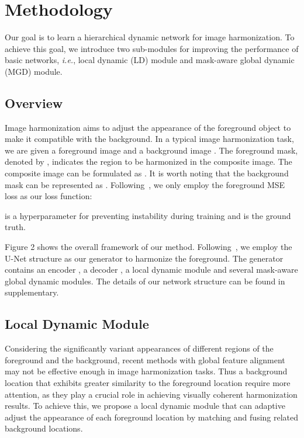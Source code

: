 \documentclass[sigconf]{acmart}
\begin{document}
\section{Methodology}
Our goal is to learn a hierarchical dynamic network for image harmonization. To achieve this goal, we introduce two sub-modules for improving the performance of basic networks, \emph{i.e.}, local dynamic (LD) module and mask-aware global dynamic (MGD) module.

\subsection{Overview}
Image harmonization aims to adjust the appearance of the foreground object to make it compatible with the background. In a typical image harmonization task, we are given a foreground image  and a background image . The foreground mask, denoted by , indicates the region to be harmonized in the composite image. The composite image  can be formulated as . It is worth noting that the background mask can be represented as .
Following~\cite{sofiiuk2021foreground}, we only employ the foreground MSE loss as our loss function:

 is a hyperparameter for preventing instability during training and  is the ground truth. 

Figure 2 shows the overall framework of our method. Following~\cite{AdaIN,Bargainnet,CDTNet,Harmonizer}, we employ the U-Net structure as our generator  to harmonize the foreground. The generator  contains an encoder , a decoder , a local dynamic module and several mask-aware global dynamic modules. The details of our network structure can be found in supplementary.
\subsection{Local Dynamic Module}
Considering the significantly variant appearances of different regions of the
foreground and the background, recent methods with global feature alignment may not be effective enough in image harmonization tasks. Thus a background location that exhibits greater similarity to the foreground location require more attention, as they play a crucial role in achieving visually coherent harmonization results. To achieve this, we propose a local dynamic module that can adaptive adjust the appearance of each foreground location by matching and fusing related background locations.
\end{document}
